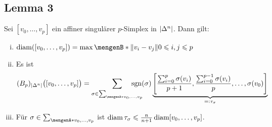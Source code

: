 \subsection{Lemma 3} %
\label{sub:1316}
Sei $[v_0, \ldots , v_p]$ ein affiner singulärer $p$-Simplex in $\abs*{\Delta^n}$. Dann gilt:
\begin{enumerate}[(i)]
	\item $\diam \enbrace*{[v_0, \ldots ,v_p]}= \max \set[\norm{v_i - v_j} ]{0 \le i,j\le p}$
	\item Es ist 
	\[
		(B_p)_{\abs*{\Delta^n}} \enbrace[\big]{[v_0, \ldots ,v_p]} = \sum_{\sigma \in \sum_{\set{v_0,\ldots ,v_p}}} \hspace{-1.8em}\sgn(\sigma)  
		\underbrace{\benbrace*{\frac{\sum_{i=0}^{p} \sigma(v_i)}{p+1}, \frac{\sum_{i=0}^{p-1} \sigma(v_i)}{p} ,\ldots , \sigma(v_0)  } }_{=: \tau_\sigma}
	\]
	\item Für $\sigma \in \sum_{\set{v_0, \ldots ,v_p}}$ ist $\diam \tau_\sigma \le \frac{n}{n+1} \diam [v_0,\ldots ,v_p]$.
\end{enumerate}

